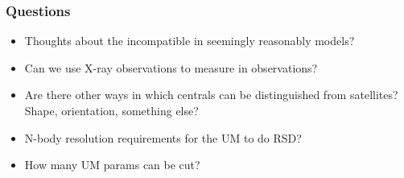 \documentclass[t]{beamer}
\begin{document}
\begin{frame}
    \frametitle{Questions}
    \begin{itemize}
        \item{Thoughts about the incompatible \fsat{} in seemingly reasonably models?}
        \item{Can we use X-ray observations to measure \fsat{} in observations?}
        \item{Are there other ways in which centrals can be distinguished from satellites? Shape, orientation, something else?}
        \item{N-body resolution requirements for the UM to do RSD?}
        \item{How many UM params can be cut?}
    \end{itemize}
\end{frame}
\end{document}
